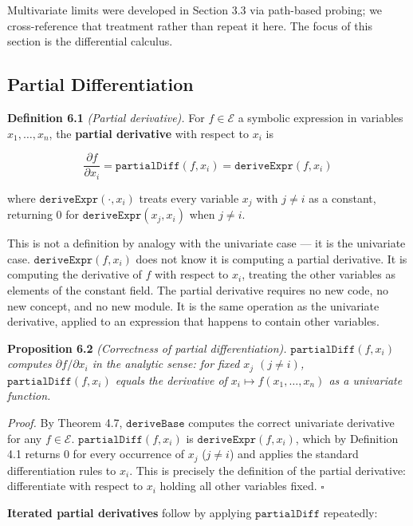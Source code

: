 \documentclass[12pt]{article}
\begin{document}
Multivariate limits were developed in Section 3.3 via path-based
probing; we cross-reference that treatment rather than repeat it here.
The focus of this section is the differential calculus.




\subsection{Partial
Differentiation}\label{partial-differentiation}

\textbf{Definition 6.1} \emph{(Partial derivative).} For
\(f \in \mathcal{E}\) a symbolic expression in variables
\(x_1, \ldots, x_n\), the \textbf{partial derivative} with respect to
\(x_i\) is

\[\frac{\partial f}{\partial x_i} = \mathtt{partialDiff}(f, x_i) = \mathtt{deriveExpr}(f, x_i)\]

where \(\mathtt{deriveExpr}(\cdot, x_i)\) treats every variable \(x_j\)
with \(j \neq i\) as a constant, returning \(0\) for
\(\mathtt{deriveExpr}(x_j, x_i)\) when \(j \neq i\).

This is not a definition by analogy with the univariate case --- it is
the univariate case. \(\mathtt{deriveExpr}(f, x_i)\) does not know it is
computing a partial derivative. It is computing the derivative of \(f\)
with respect to \(x_i\), treating the other variables as elements of the
constant field. The partial derivative requires no new code, no new
concept, and no new module. It is the same operation as the univariate
derivative, applied to an expression that happens to contain other
variables.

\textbf{Proposition 6.2} \emph{(Correctness of partial
differentiation).} \emph{\(\mathtt{partialDiff}(f, x_i)\) computes
\(\partial f / \partial x_i\) in the analytic sense: for fixed \(x_j\)
\((j \neq i)\), \(\mathtt{partialDiff}(f, x_i)\) equals the derivative
of \(x_i \mapsto f(x_1, \ldots, x_n)\) as a univariate function.}

\emph{Proof.} By Theorem 4.7, \(\mathtt{deriveBase}\) computes the
correct univariate derivative for any \(f \in \mathcal{E}\).
\(\mathtt{partialDiff}(f, x_i)\) is \(\mathtt{deriveExpr}(f, x_i)\),
which by Definition 4.1 returns \(0\) for every occurrence of \(x_j\)
(\(j \neq i\)) and applies the standard differentiation rules to
\(x_i\). This is precisely the definition of the partial derivative:
differentiate with respect to \(x_i\) holding all other variables fixed.
\(\square\)

\textbf{Iterated partial derivatives} follow by applying
\(\mathtt{partialDiff}\) repeatedly:
\end{document}
